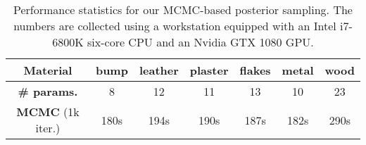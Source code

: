 \begin{table}[t]
	\centering
	\caption{\label{fig:performance}
		Performance statistics for our MCMC-based posterior sampling.
		The numbers are collected using a workstation equipped with an Intel i7-6800K six-core CPU and an Nvidia GTX 1080 GPU.  %
	}
	\addtolength{\tabcolsep}{-3pt}
	\begin{tabular}{c|cccccc}
		\textbf{Material} & bump & leather & plaster & flakes & metal & wood\\
		\hline
		\textbf{\# params.} & 8 & 12 & 11 & 13 & 10 & 23\\
		\textbf{MCMC} (1k iter.) & 180s & 194s & 190s & 187s & 182s & 290s
	\end{tabular}
\end{table}

